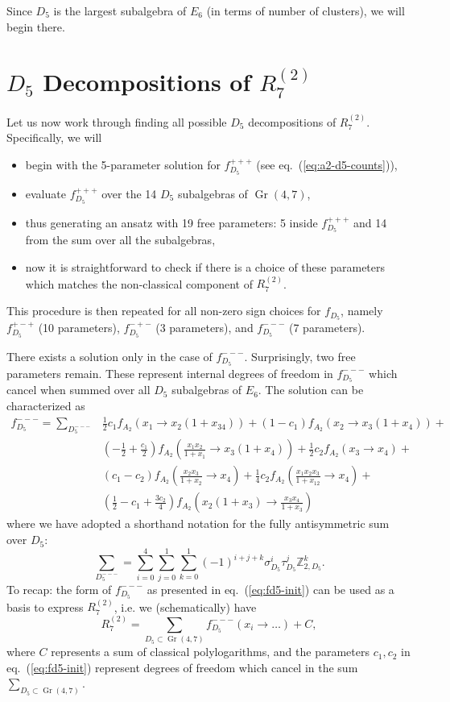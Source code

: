 \documentclass[11pt]{article}
\DeclareMathOperator{\Gr}{Gr}
\def\nl{\nonumber\\}
\def\pdfeq#1{\texorpdfstring{$#1$}{a}}
\begin{document}
Since $D_5$ is the largest subalgebra of $E_6$ (in terms of number of clusters), we will begin there. 

\section{\pdfeq{D_5} Decompositions of \pdfeq{R^{(2)}_7}}\label{sec:d5-func}

Let us now work through finding all possible $D_5$ decompositions of $R^{(2)}_7$. Specifically, we will
\begin{itemize}
	\item begin with the 5-parameter solution for $f_{D_5}^{+++}$ (see eq.~(\ref{eq:a2-d5-counts})),
	\item evaluate $f_{D_5}^{+++}$ over the 14 $D_5$ subalgebras of $\Gr(4,7)$,
	\item thus generating an ansatz with 19 free parameters: 5 inside $f_{D_5}^{+++}$ and 14 from the sum over all the subalgebras,
	\item now it is straightforward to check if there is a choice of these parameters which matches the non-classical component of $R^{(2)}_7$.
\end{itemize}
This procedure is then repeated for all non-zero sign choices for $f_{D_5}$, namely $f_{D_5}^{+-+}$ (10 parameters), $f_{D_5}^{-+-}$ (3 parameters), and $f_{D_5}^{---}$ (7 parameters). 

There exists a solution only in the case of $f_{D_5}^{---}$. Surprisingly, two free parameters remain. These represent internal degrees of freedom in $f_{D_5}^{---}$ which cancel when summed over all $D_5$ subalgebras of $E_6$. The solution can be characterized as 
\begin{align}\label{eq:fd5-init}
f_{D_5}^{---} = \sum_{D_5^{---}}
	&\frac{1}{2} c_1 f_{A_2}\left(x_1\to x_2 \left(1+x_{34}\right)\right)+
	\left(1-c_1\right) f_{A_2}\left(x_2\to x_3 \left(1+x_4\right)\right)+\nl
	&\left(-\frac{1}{2}+\frac{c_1}{2}\right) f_{A_2}\left(\frac{x_1 x_2}{1+x_1}\to x_3 \left(1+x_4\right)\right)+
	\frac{1}{2} c_2 f_{A_2}\left(x_3\to x_4\right)+\nl
	&\left(c_1-c_2\right) f_{A_2}\left(\frac{x_2 x_3}{1+x_2}\to x_4\right)+
	\frac{1}{4} c_2 f_{A_2}\left(\frac{x_1 x_2 x_3}{1+x_{12}}\to x_4\right)+\nl
	&\left(\frac{1}{2}-c_1+\frac{3 c_2}{4}\right) f_{A_2}\left(x_2 \left(1+x_3\right)\to \frac{x_3 x_4}{1+x_3}\right)
\end{align}
where we have adopted a shorthand notation for the fully antisymmetric sum over $D_5$:
\begin{equation}
	\sum_{D_5^{---}} = \sum_{i=0}^4\sum_{j=0}^1\sum_{k=0}^1 (-1)^{i+j+k} \sigma_{D_5}^i\tau_{D_5}^j\mathbb{Z}_{2,D_5}^k.
\end{equation}
To recap: the form of $f_{D_5}^{---}$ as presented in eq.~(\ref{eq:fd5-init}) can be used as a basis to express $R^{(2)}_7$, i.e. we (schematically) have
\begin{equation}
	R^{(2)}_7 = \sum_{D_5\subset \Gr(4,7)} f_{D_5}^{---}(x_i \to \ldots) + C,
\end{equation}
where $C$ represents a sum of classical polylogarithms, and the parameters $c_1, c_2$ in eq.~(\ref{eq:fd5-init}) represent degrees of freedom which cancel in the sum $\sum_{D_5\subset \Gr(4,7)}$.
\end{document}
